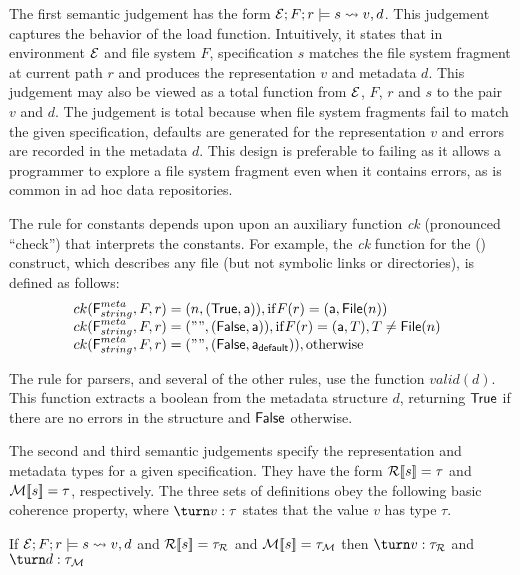 The first semantic judgement has the form $\mathcal{E};F;r \models s \rightsquigarrow
v,d$.  This judgement captures the behavior of the load function.
Intuitively, it states that in environment $\mathcal{E}$ and file system $F$,
specification $s$ matches the file system fragment at current path $r$
and produces the representation $v$ and metadata $d$.  This judgement
may also be viewed as a total function from $\mathcal{E}$, $F$, $r$ and $s$
to the pair $v$ and $d$.  The judgement is total because when file
system fragments fail to match the given specification, defaults are
generated for the representation $v$ and errors are recorded in the
metadata $d$.  This design is preferable to failing as it allows a
programmer to explore a file system fragment even when it contains
errors, as is common in ad hoc data repositories.

The rule for constants depends upon upon an auxiliary function 
{\it ck} (pronounced ``check'') that interprets the constants.  For
example, the {\it ck} function for the (\pfile) construct, which
describes any file (but not symbolic links or directories), is defined
as follows:
\[
\begin{array}{@{}l}
ck(\mbox{\sf F}^{\metapdty}_{\stringty},F,r) = (n,(\True,\att)), \mathrm{if } F(r) = (\att,\File{n}) \\
ck(\mbox{\sf F}^{\metapdty}_{\stringty},F,r) = ("",(\False,\att)), \mathrm{if } F(r) = (\att,T), T \not=\File{n} \\
ck(\mbox{\sf F}^{\metapdty}_{\stringty},F,r) = ("",(\False,\defaultatt)), \mathrm{otherwise}
\end{array}
\]

The rule for \padshaskell{} parsers, and several of the other rules,
use the function $valid(d)$.  This function extracts a boolean from
the metadata structure $d$, returning $\mathsf{True}$ if there are no errors
in the structure and $\mathsf{False}$ otherwise. 

The second and third semantic judgements specify the representation
and metadata types for a given specification.  They have the form
${\cal R}[\![ s ]\!] = \tau$ and ${\cal M}[\![ s ]\!] = \tau$, respectively.  The three
sets of definitions obey the following basic coherence property, where
$\turn v : \tau$ states that the value $v$ has type $\tau$.

\begin{proposition}
  If $\mathcal{E};F;r \models s \rightsquigarrow v,d$ and ${\cal R}[\![ s ]\!] =
  \tau_{\mathcal{R}}$ and ${\cal M}[\![ s ]\!] = \tau_{\mathcal{M}}$ then $\turn
  v : \tau_{\mathcal{R}}$ and $\turn d : \tau_{\mathcal{M}}$
\end{proposition}

